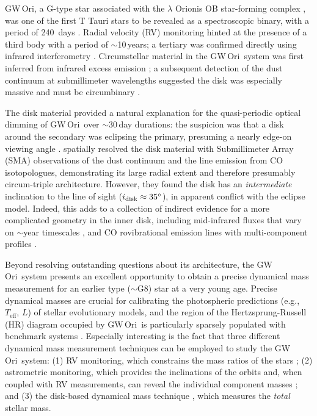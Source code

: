 \documentclass[twocolumn]{aastex61}
\newcommand{\obj}{GW\,Ori}
\begin{document}
\obj, a G-type star associated with the $\lambda$ Orionis OB star-forming complex \citep{dolan00,dolan01,dolan02}, was one of the first T Tauri stars to be revealed as a spectroscopic binary, with a period of \mbox{240 days} \citep{mathieu91}. Radial velocity (RV) monitoring hinted at the presence of a third body with a period of $\sim$10\,years; a tertiary was confirmed directly using infrared interferometry \citep{berger11}. 
Circumstellar material in the \obj\ system was first inferred from infrared excess emission \citep{mathieu91}; a subsequent detection of the dust continuum at submillimeter wavelengths suggested the disk was especially massive and must be circumbinary \citep[$M_{\rm disk} \gtrsim 0.1 M_\odot$;][]{mathieu95}. 

The disk material provided a natural explanation for the quasi-periodic optical dimming of \obj\ over $\sim$30\,day durations: the suspicion was that a disk around the secondary was eclipsing the primary, presuming a nearly edge-on viewing angle \citep{shevchenko92,shevchenko98}.
\citet{fang17} spatially resolved the disk material with Submillimeter Array (SMA) observations of the dust continuum and the line emission from CO isotopologues, demonstrating its large radial extent and therefore presumably circum-triple architecture.  However, they found the disk has an \emph{intermediate} inclination to the line of sight ($i_\mathrm{disk} \approx 35\mbox{$^\circ$}$), in apparent conflict with the eclipse model. Indeed, this adds to a collection of indirect evidence for a more complicated geometry in the inner disk, including mid-infrared fluxes that vary on $\sim$year timescales \citep{fang14}, and CO rovibrational emission lines with multi-component profiles \citep[which requires a complicated geometry and/or temperature structure in the inner disk;][]{najita03}.

Beyond resolving outstanding questions about its architecture, the \obj\ system presents an excellent opportunity to obtain a precise dynamical mass measurement for an earlier type ($\sim$G8) star at a very young age. Precise dynamical masses are crucial for calibrating the photospheric predictions (e.g., $T_\mathrm{eff}$, $L$) of stellar evolutionary models, and the region of the Hertzsprung-Russell (HR) diagram occupied by \obj\ is particularly sparsely populated with benchmark systems \citep{stassun14}. Especially interesting is the fact that three different dynamical mass measurement techniques can be employed to study the \obj\ system: (1) RV monitoring, which constrains the mass ratios of the stars \citep{mathieu91,fang14}; (2) astrometric monitoring, which provides the inclinations of the orbits and, when coupled with RV measurements, can reveal the individual component masses \citep{berger11}; and (3) the disk-based dynamical mass technique \citep[e.g.,][]{simon00,simon17,rosenfeld12b,czekala15a,czekala16}, which measures the {\it total} stellar mass.
\end{document}
